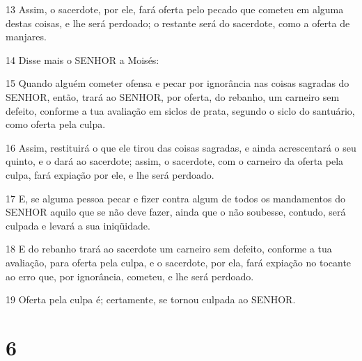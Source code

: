 \par 13 Assim, o sacerdote, por ele, fará oferta pelo pecado que cometeu em alguma destas coisas, e lhe será perdoado; o restante será do sacerdote, como a oferta de manjares.
\par 14 Disse mais o SENHOR a Moisés:
\par 15 Quando alguém cometer ofensa e pecar por ignorância nas coisas sagradas do SENHOR, então, trará ao SENHOR, por oferta, do rebanho, um carneiro sem defeito, conforme a tua avaliação em siclos de prata, segundo o siclo do santuário, como oferta pela culpa.
\par 16 Assim, restituirá o que ele tirou das coisas sagradas, e ainda acrescentará o seu quinto, e o dará ao sacerdote; assim, o sacerdote, com o carneiro da oferta pela culpa, fará expiação por ele, e lhe será perdoado.
\par 17 E, se alguma pessoa pecar e fizer contra algum de todos os mandamentos do SENHOR aquilo que se não deve fazer, ainda que o não soubesse, contudo, será culpada e levará a sua iniqüidade.
\par 18 E do rebanho trará ao sacerdote um carneiro sem defeito, conforme a tua avaliação, para oferta pela culpa, e o sacerdote, por ela, fará expiação no tocante ao erro que, por ignorância, cometeu, e lhe será perdoado.
\par 19 Oferta pela culpa é; certamente, se tornou culpada ao SENHOR.

\chapter{6}

